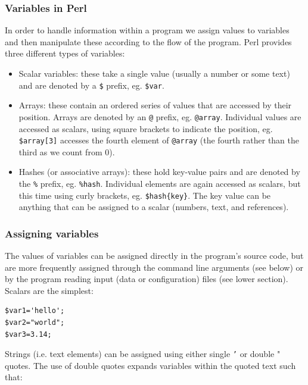 \documentclass[11pt]{article}
\begin{document}
\subsubsection{Variables in Perl}
\label{sec-9-0-1}

In order to handle information within a program we assign values to
variables and then manipulate these according to the flow of the
program. Perl provides three different types of variables:

\begin{itemize}
\item Scalar variables: these take a single value (usually a number or some text) 
and are denoted by a \texttt{\$} prefix, eg. \texttt{\$var}.

\item Arrays: these contain an ordered series of values that are accessed by their
position. Arrays are denoted by an \texttt{@} prefix, eg. \texttt{@array}.
Individual values are accessed as scalars, using square brackets to
indicate the position, eg. \texttt{\$array[3]} accesses the fourth element of
\texttt{@array} (the fourth rather than the third as we count from 0).

\item Hashes (or associative arrays): these hold key-value pairs and are
denoted by the \texttt{\%} prefix, eg. \texttt{\%hash}. Individual elements are again
accessed as scalars, but this time using curly brackets, eg.
\texttt{\$hash\{key\}}. The key value can be anything that can be assigned to a
scalar (numbers, text, and references).
\end{itemize}

\subsubsection{Assigning variables}
\label{sec-9-0-2}

The values of variables can be assigned directly in the program's source
code, but are more frequently assigned through the command line
arguments (see below) or by the program reading input (data or
configuration) files (see lower section). Scalars are the simplest:

\begin{verbatim}
$var1='hello'; 
$var2="world";
$var3=3.14;
\end{verbatim}

Strings (i.e. text elements) can be assigned using either single \texttt{’} or
double " quotes. The use of double quotes expands variables within the
quoted text such that:
\end{document}

